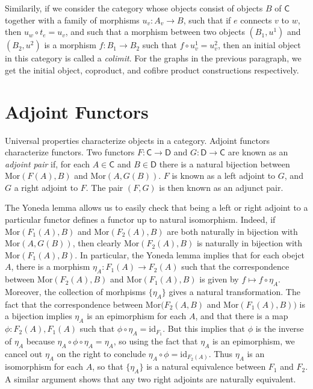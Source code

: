 Similarily, if we consider the category whose objects consist of objects $B$ of $\mathsf{C}$ together with a family of morphisms $u_v: A_v \to B$, such that if $e$ connects $v$ to $w$, then $u_w \circ t_e = u_v$, and such that a morphism between two objects $(B_1,u^1)$ and $(B_2,u^2)$ is a morphism $f: B_1 \to B_2$ such that $f \circ u^1_v = u^2_v$, then an initial object in this category is called a \emph{colimit}. For the graphs in the previous paragraph, we get the initial object, coproduct, and cofibre product constructions respectively.








\section{Adjoint Functors}

Universal properties characterize objects in a category. Adjoint functors characterize functors. Two functors $F: \mathsf{C} \to \mathsf{D}$ and $G: \mathsf{D} \to \mathsf{C}$ are known as an \emph{adjoint pair} if, for each $A \in \mathsf{C}$ and $B \in \mathsf{D}$ there is a natural bijection between $\text{Mor}(F(A), B)$ and $\text{Mor}(A,G(B))$. $F$ is known as a left adjoint to $G$, and $G$ a right adjoint to $F$. The pair $(F,G)$ is then known as an adjunct pair.

The Yoneda lemma allows us to easily check that being a left or right adjoint to a particular functor defines a functor up to natural isomorphism. Indeed, if $\text{Mor}(F_1(A),B)$ and $\text{Mor}(F_2(A),B)$ are both naturally in bijection with $\text{Mor}(A,G(B))$, then clearly $\text{Mor}(F_2(A),B)$ is naturally in bijection with $\text{Mor}(F_1(A),B)$. In particular, the Yoneda lemma implies that for each obejct $A$, there is a morphism $\eta_A: F_1(A) \to F_2(A)$ such that the correspondence between $\text{Mor}(F_2(A),B)$ and $\text{Mor}(F_1(A),B)$ is given by $f \mapsto f \circ \eta_A$. Moreover, the collection of morhpisms $\{ \eta_A \}$ gives a natural transformation. The fact that the correspondence between $\text{Mor}(F_2(A,B)$ and $\text{Mor}(F_1(A),B))$ is a bijection implies $\eta_A$ is an epimorphism for each $A$, and that there is a map $\phi: F_2(A),F_1(A)$ such that $\phi \circ \eta_A = \text{id}_{F_1}$. But this implies that $\phi$ is the inverse of $\eta_A$ because $\eta_A \circ \phi \circ \eta_A = \eta_A$, so using the fact that $\eta_A$ is an epimorphism, we cancel out $\eta_A$ on the right to conclude $\eta_A \circ \phi = \text{id}_{F_2(A)}$. Thus $\eta_A$ is an isomorphism for each $A$, so that $\{ \eta_A \}$ is a natural equivalence between $F_1$ and $F_2$. A similar argument shows that any two right adjoints are naturally equivalent.

